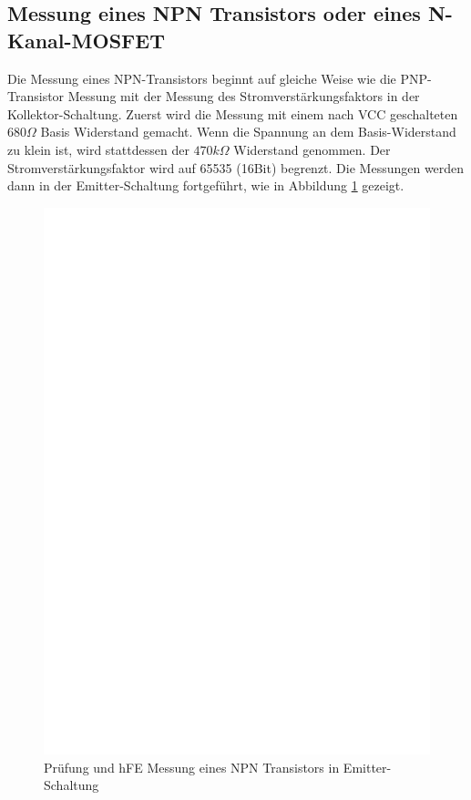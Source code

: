 \subsection{Messung eines NPN Transistors oder eines N-Kanal-MOSFET}
Die Messung eines NPN-Transistors beginnt auf gleiche Weise wie die PNP-Transistor Messung
mit der Messung des Stromverst\"arkungsfaktors in der Kollektor-Schaltung.
Zuerst wird die Messung mit einem nach VCC geschalteten \(680\Omega\) Basis Widerstand gemacht.
Wenn die Spannung an dem Basis-Widerstand zu klein ist, wird stattdessen der \(470k\Omega\) Widerstand genommen.
Der Stromverst\"arkungsfaktor wird auf 65535 (16Bit) begrenzt.
Die Messungen werden dann in der Emitter-Schaltung fortgef\"uhrt, wie in Abbildung \ref{fig:npnce} gezeigt.
\begin{figure}[H]
\centering
\includegraphics[]{../FIG/NPNce.eps}
\caption{Pr\"ufung und hFE Messung eines NPN Transistors in Emitter-Schaltung}
\label{fig:npnce}
\end{figure}
